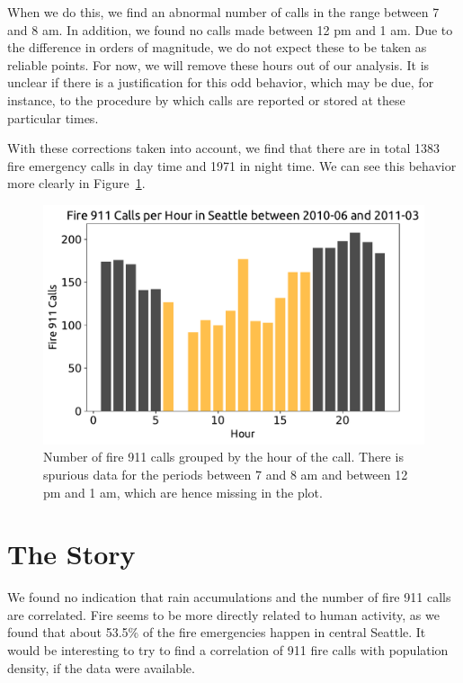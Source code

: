 \documentclass[12pt,a4paper]{article}
\begin{document}
When we do this, we find an abnormal number of calls in the range between 7 and 8 am. In addition, we found no calls made between 12 pm and 1 am. Due to the difference in orders of magnitude, we do not expect these to be taken as reliable points. For now, we will remove these hours out of our analysis. It is unclear if there is a justification for this odd behavior, which may be due, for instance, to the procedure by which calls are reported or stored at these particular times.

With these corrections taken into account, we find that there are in total 1383 fire emergency calls in day time and 1971 in night time. We can see this behavior more clearly in Figure~\ref{TimeOfTheDay}.


\begin{figure}[ht!]
\centering
\includegraphics[scale=0.65]{figs/TimeOfTheDay.pdf}
\caption{Number of fire 911 calls grouped by the hour of the call. There is spurious data for the periods between 7 and 8 am and between 12 pm and 1 am, which are hence missing in the plot.}
\label{TimeOfTheDay}
\end{figure}


\section{The Story}

We found no indication that rain accumulations and the number of fire 911 calls are correlated. Fire seems to be more directly related to human activity, as we found that about 53.5\% of the fire emergencies happen in central Seattle. It would be interesting to try to find a correlation of 911 fire calls with population density, if the data were available.
\end{document}
